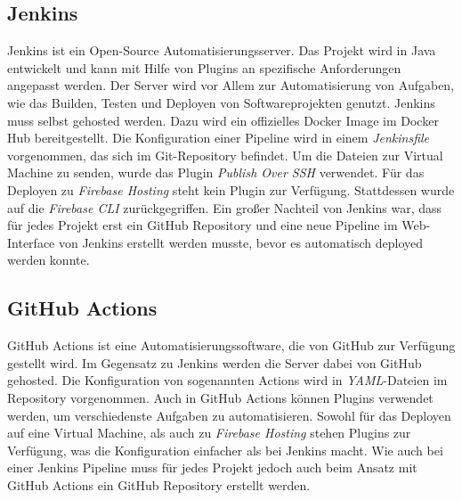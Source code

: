 \subsection{Jenkins}
Jenkins ist ein Open-Source Automatisierungsserver. Das Projekt wird in
Java entwickelt und kann mit Hilfe von Plugins an spezifische Anforderungen
angepasst werden.
Der Server wird vor Allem zur Automatisierung von Aufgaben, wie das Builden,
Testen und Deployen von Softwareprojekten genutzt.
Jenkins muss selbst gehosted werden. Dazu wird ein offizielles Docker Image
im Docker Hub bereitgestellt.
Die Konfiguration einer Pipeline wird in einem \textit{Jenkinsfile} vorgenommen,
das sich im Git-Repository befindet.
Um die Dateien zur Virtual Machine zu senden, wurde das Plugin \textit{Publish Over SSH}
verwendet. Für das Deployen zu \textit{Firebase Hosting} steht kein Plugin zur
Verfügung. Stattdessen wurde auf die \textit{Firebase CLI} zurückgegriffen.
Ein großer Nachteil von Jenkins war, dass für jedes Projekt erst ein GitHub
Repository und eine neue Pipeline im Web-Interface von Jenkins erstellt werden
musste, bevor es automatisch deployed werden konnte.



\subsection{GitHub Actions}
GitHub Actions ist eine Automatisierungssoftware, die von GitHub zur Verfügung
gestellt wird. Im Gegensatz zu Jenkins werden die Server dabei von GitHub gehosted.
Die Konfiguration von sogenannten Actions wird in \textit{YAML}-Dateien im
Repository vorgenommen.
Auch in GitHub Actions können Plugins verwendet werden, um verschiedenste Aufgaben
zu automatisieren.
Sowohl für das Deployen auf eine Virtual Machine, als auch zu \textit{Firebase Hosting}
stehen Plugins zur Verfügung, was die Konfiguration einfacher als bei Jenkins macht.
Wie auch bei einer Jenkins Pipeline muss für jedes Projekt jedoch auch beim
Ansatz mit GitHub Actions ein GitHub Repository erstellt werden.


